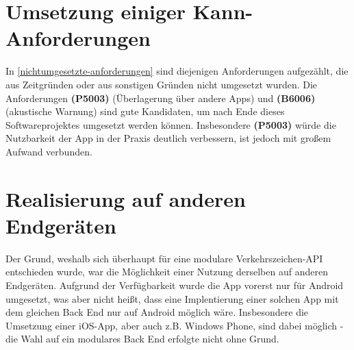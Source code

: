 \documentclass[12pt,a4paper,ngerman,enabledeprecatedfontcommands]{scrreprt}
\begin{document}
\section{Umsetzung einiger Kann-Anforderungen}
In \cref{nichtumgesetzte-anforderungen} sind diejenigen Anforderungen aufgezählt, die aus Zeitgründen oder aus sonstigen Gründen nicht umgesetzt wurden. Die Anforderungen \textbf{(P5003)} (Überlagerung über andere \gls{App}s) und \textbf{(B6006)} (akustische Warnung) sind gute Kandidaten, um nach Ende dieses Softwareprojektes umgesetzt werden können. Insbesondere \textbf{(P5003)} würde die Nutzbarkeit der \gls{App} in der Praxis deutlich verbessern, ist jedoch mit großem Aufwand verbunden.\\

\section{Realisierung auf anderen Endgeräten}
Der Grund, weshalb sich überhaupt für eine modulare \gls{Verkehrszeichen-API} entschieden wurde, war die Möglichkeit einer Nutzung derselben auf anderen Endgeräten. Aufgrund der Verfügbarkeit wurde die App vorerst nur für Android umgesetzt, was aber nicht heißt, dass eine Implentierung einer solchen \gls{App} mit dem gleichen Back End nur auf Android möglich wäre. Insbesondere die Umsetzung einer iOS-\gls{App}, aber auch z.B. Windows Phone, sind dabei möglich - die Wahl auf ein modulares Back End erfolgte nicht ohne Grund.\\






\end{document}
